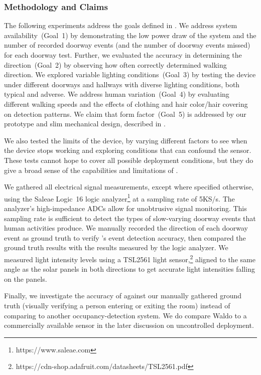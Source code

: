 \subsubsection{Methodology and Claims}
The following experiments address the goals defined in .
We address system availability~(Goal~1) by demonstrating the low power draw of the system and the number of recorded doorway events (and the number of doorway events missed) for each doorway test.
Further, we evaluated the accuracy in determining the direction~(Goal~2) by observing how often \sysname correctly determined walking direction.
We explored variable lighting conditions~(Goal~3) by testing the device under \numDoors different doorways and hallways with diverse lighting conditions, both typical and adverse.
We address human variation~(Goal~4) by evaluating different walking speeds and the effects of clothing and hair color/hair covering on detection patterns.
We claim that form factor~(Goal~5) is addressed by our prototype and slim mechanical design, described in .

We also tested the limits of the device, by varying different factors to see when the device stops working and exploring conditions that can confound the sensor.
These tests cannot hope to cover all possible deployment conditions, but they do give a broad sense of the capabilities and limitations of \sysname.

We gathered all electrical signal measurements, except where specified otherwise, using the Saleae Logic~16 logic analyzer\footnote{https://www.saleae.com} at a sampling rate of 5KS/s.
The analyzer's high-impedance ADCs allow for unobtrusive signal monitoring.
This sampling rate is sufficient to detect the types of slow-varying doorway events that human activities produce.
We manually recorded the direction of each doorway event as ground truth to verify \sysname's event detection accuracy, then compared the ground truth results with the results measured by the logic analyzer.
We measured light intensity levels using a TSL2561 light sensor,\footnote{https://cdn-shop.adafruit.com/datasheets/TSL2561.pdf}
aligned to the same angle as the solar panels in both directions to get accurate light intensities falling on the panels.

Finally, we investigate the accuracy of \sysname against our manually gathered ground truth (visually verifying a person entering or exiting the room) instead of comparing to another occupancy-detection system.  
We do compare Waldo to a commercially available sensor in the later discussion on uncontrolled deployment.

